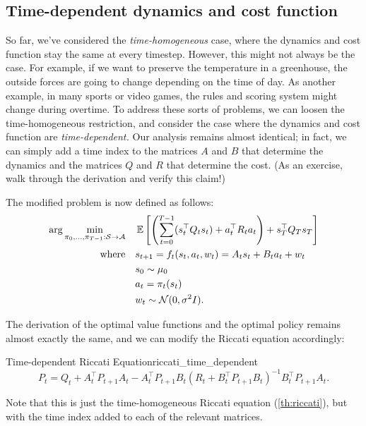 \documentclass[../main/main]{subfiles}
\begin{document}
\subsection[Time-dependency]{Time-dependent dynamics and cost function} \label{sec:time_dep_lqr}

So far, we've considered the \emph{time-homogeneous} case, where the dynamics and cost function stay the same at every timestep. However, this might not always be the case. For example, if we want to preserve the temperature in a greenhouse, the outside forces are going to change depending on the time of day.
As another example, in many sports or video games, the rules and scoring system might change during overtime.
To address these sorts of problems, we can loosen the time-homogeneous restriction, and consider the case where the dynamics and cost function are \emph{time-dependent.}
Our analysis remains almost identical; in fact, we can simply add a time index to the matrices $A$ and $B$ that determine the dynamics and the matrices $Q$ and $R$ that determine the cost. (As an exercise, walk through the derivation and verify this claim!)

The modified problem is now defined as follows:
\begin{align*}
    \arg \min_{\pi_{0}, \dots, \pi_{T-1} : \mathcal{S} \to \mathcal{A}} \quad & \operatorname*{\mathbb{E}} \left[ \left( \sum_{t=0}^{T-1} (s_t^\top Q_t s_t) + a_t^\top R_t a_t \right) + s_T^\top Q_T s_T \right] \\
    \textrm{where} \quad & s_{t+1} = f_t(s_t, a_t, w_t) = A_t s_t + B_t a_t + w_t \\
    & s_0 \sim \mu_0 \\
    & a_t = \pi_t (s_t) \\
    & w_t \sim \mathcal{N}(0, \sigma^2 I).
\end{align*}

The derivation of the optimal value functions and the optimal policy remains almost exactly the same,
and we can modify the Riccati equation accordingly:

\begin{theorem}{Time-dependent Riccati Equation}{riccati_time_dependent}
    \[
        P_t = Q_t + A_t^\top P_{t+1} A_t - A_t^\top P_{t+1} B_t (R_t + B_t^\top P_{t+1} B_t)^{-1} B_t^\top P_{t+1} A_t.
    \]

    \noindent
    Note that this is just the time-homogeneous Riccati equation (\autoref{th:riccati}), but with the
    time index added to each of the relevant matrices.
\end{theorem}
\end{document}
